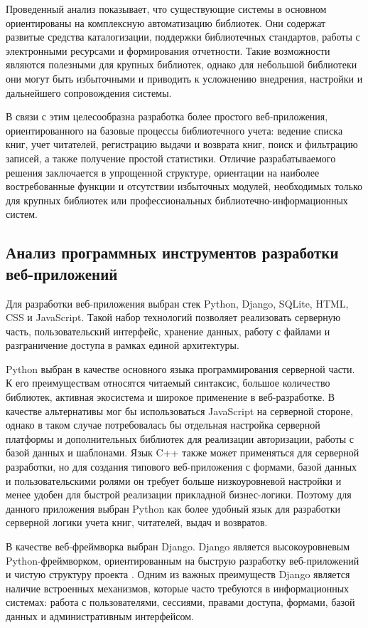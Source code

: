 Проведенный анализ показывает, что существующие системы в основном ориентированы
на комплексную автоматизацию библиотек. Они содержат развитые средства
каталогизации, поддержки библиотечных стандартов, работы с электронными ресурсами
и формирования отчетности. Такие возможности являются полезными для крупных
библиотек, однако для небольшой библиотеки они могут быть избыточными и приводить
к усложнению внедрения, настройки и дальнейшего сопровождения системы.

В связи с этим целесообразна разработка более простого веб-приложения,
ориентированного на базовые процессы библиотечного учета: ведение списка книг,
учет читателей, регистрацию выдачи и возврата книг, поиск и фильтрацию записей,
а также получение простой статистики. Отличие разрабатываемого решения заключается
в упрощенной структуре, ориентации на наиболее востребованные функции и отсутствии
избыточных модулей, необходимых только для крупных библиотек или профессиональных
библиотечно-информационных систем.

\subsection{Анализ программных инструментов разработки веб-приложений}

Для разработки веб-приложения выбран стек Python, Django, SQLite, HTML, CSS и
JavaScript. Такой набор технологий позволяет реализовать серверную часть,
пользовательский интерфейс, хранение данных, работу с файлами и разграничение
доступа в рамках единой архитектуры.

Python выбран в качестве основного языка программирования серверной части.
К его преимуществам относятся читаемый синтаксис, большое количество библиотек,
активная экосистема и широкое применение в веб-разработке. В качестве альтернативы
мог бы использоваться JavaScript на серверной стороне, однако в таком случае
потребовалась бы отдельная настройка серверной платформы и дополнительных
библиотек для реализации авторизации, работы с базой данных и шаблонами. Язык C++
также может применяться для серверной разработки, но для создания типового
веб-приложения с формами, базой данных и пользовательскими ролями он требует
больше низкоуровневой настройки и менее удобен для быстрой реализации
прикладной бизнес-логики. Поэтому для данного приложения выбран Python как более
удобный язык для разработки серверной логики учета книг, читателей, выдач и
возвратов.

В качестве веб-фреймворка выбран Django. Django является высокоуровневым
Python-фреймворком, ориентированным на быструю разработку веб-приложений и
чистую структуру проекта \cite{django_main}. Одним из важных преимуществ Django
является наличие встроенных механизмов, которые часто требуются в информационных
системах: работа с пользователями, сессиями, правами доступа, формами, базой
данных и административным интерфейсом.


